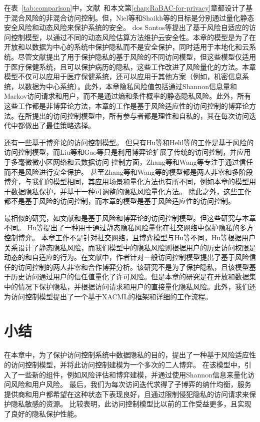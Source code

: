 在表~\ref{tab:comparison}中，文献~\cite{ni2010risk,shaikh2012dynamic,santos2016framework,wang2011quantified,zhang2018privacy,zhen2015risk}和本文第\ref{chap:RaBAC-for-privacy}章都设计了基于混合风险的非混合访问控制。但，Niel等\cite{ni2010risk}和Shaikh等\cite{shaikh2012dynamic}的目标是分别通过量化静态安全风险和动态风险来保护系统的安全。 dos Santos等\cite{santos2016framework}提出了基于风险自适应的访问控制模型，以通过不同的动态风险估算方法维护云安全性。本章的模型是为了在开放和以数据为中心的系统中保护隐私而不是安全保护，同时适用于本地化和云系统。尽管文献\cite{wang2011quantified,zhen2015risk,zhang2018privacy}提出了用于保护隐私的基于风险的不同访问模型，但这些模型仅适用于医疗保健系统，且可以保护病历的隐私，这些工作改进了风险量化的方法。本章模型不仅可以应用于医疗保健系统，还可以应用于其他方案（例如，机密信息系统，以数据为中心系统）。此外，本章隐私风险值包括通过Shannon信息量和Markov访问请求和用户，而不是通过熵\cite{zhen2015risk}和条件概率\cite{zhang2018privacy}的静态隐私风险\cite{wang2011quantified}。此外，所有这些工作都是非博弈论方法，本章的工作是基于风险适应性的访问控制的博弈论方法。在所提出的访问控制模型中，所有参与者都是理性和自私的，其在每次访问迭代中都做出了最佳策略选择。


还有一些基于博弈论的访问控制模型\cite{liu2016dynamic,gao2018game,zhang2015towards,wang2019game,hu2014game,helil2017non}。 但只有Hu等\cite{hu2014game}和Helil等\cite{helil2017non}的工作是基于风险的访问控制模型，而Liu等\cite{liu2016dynamic}和Gao等\cite{gao2018game}只是利用博弈论扩展了传统的访问控制，并应用于多毫微微小区网络和云数据访问 控制方面，Zhang等\cite{zhang2015towards}和Wang等\cite{wang2019game}专注于通过信任而不是风险进行安全保护。 甚至Zhang等和Wang等的模型都是两人非零和多阶段博弈，与我们的模型相同，其应用场景和量化方法也有所不同，例如本章的模型用于数据隐私保护，并基于一种可调整的隐私风险量化方法。 除此之外，这些工作\cite{liu2016dynamic,gao2018game,zhang2015towards,wang2019game}都不是基于风险的访问控制，而本章的模型是基于风险适应性的访问控制。

最相似的研究，如文献\cite{hu2014game}和\cite{helil2017non}是基于风险和博弈论的访问控制模型。但这些研究与本章不同。 Hu等\cite{hu2014game}提出了一种用于通过静态隐私风险量化在社交网络中保护隐私的多方控制博弈。
本章工作不是针对社交网络，且博弈模型与Hu等\cite{hu2014game}不同，Hu等\cite{hu2014game}根据用户关系设计了静态隐私风险，而我们模型中的隐私风险则根据用户的历史访问权限是动态的和自适应的行为。在文献\cite{helil2017non}中，作者针对一般访问控制模型提出了基于风险信任的访问控制的两人非零和合作博弈分析。该研究不是为了保护隐私，且该模型基于历史访问通过用户的信任值量化了许可风险。但是本章的研究是在开放和数据集中的情况下保护隐私，并根据访问请求和用户的直接量化隐私风险。此外，我们还为访问控制模型提出了一个基于XACML的框架和详细的工作流程。

\section{小结}\label{sec:conclusions}

在本章中，为了保护访问控制系统中数据隐私的目的，提出了一种基于风险适应性的访问控制模型，并将此访问控制建模为一个多次的二人博弈。 在该模型中，引入了一些新的组件，例如风险评估和博弈建模，并通过使用Shannon信息来量化访问风险和用户风险。 最后，我们为每次访问迭代求得了子博弈的纳什均衡，服务提供商和用户都希望在这种状态下表现良好，且通过限制侵犯隐私的访问请求来保护隐私敏感的资源。 比较表明，此访问控制模型比以前的工作受益更多，且实现了良好的隐私保护性能。